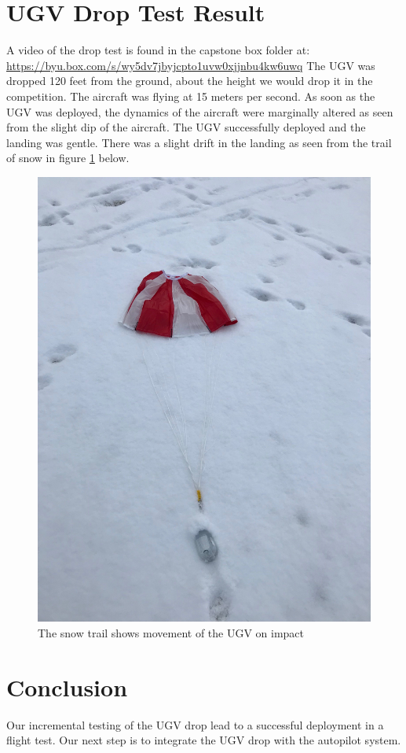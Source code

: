 \documentclass[]{auvsi_doc}
\begin{document}
\section*{UGV Drop Test Result}
A video of the drop test is found in the capstone box folder at: \url{https://byu.box.com/s/wy5dv7jbyjcpto1uvw0xjjnbu4kw6uwq}
The UGV was dropped 120 feet from the ground, about the height we would drop it in the competition. The aircraft was flying at 15 meters per second.
As soon as the UGV was deployed, the dynamics of the aircraft were marginally altered as seen from the slight dip of the aircraft.
The UGV successfully deployed and the landing was gentle. There was a slight drift in the landing as seen from the trail of snow in figure \ref{fig:landing} below.
\begin{figure}[h!]
	\centering
	\includegraphics[width=.9\columnwidth]{figs/landing}
	\caption{The snow trail shows movement of the UGV on impact}
	\label{fig:landing}
\end{figure} 

\section*{Conclusion}
Our incremental testing of the UGV drop lead to a successful deployment in a flight test. Our next step is to integrate the UGV drop with the autopilot system.
\end{document}
